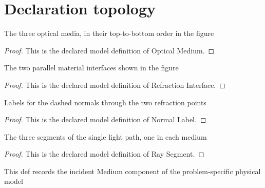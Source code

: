 \section{Declaration topology}
\begin{definition}
  \label{def:physics:phyx-mini-0000:phyxminiproblems-problemphyxmini0000-opticalmedium}
  The three optical media, in their top-to-bottom order in the figure
\end{definition}
\begin{proof}
  This is the declared model definition of Optical Medium.
\end{proof}
\begin{definition}
  \label{def:physics:phyx-mini-0000:phyxminiproblems-problemphyxmini0000-refractioninterface}
  The two parallel material interfaces shown in the figure
\end{definition}
\begin{proof}
  This is the declared model definition of Refraction Interface.
\end{proof}
\begin{definition}
  \label{def:physics:phyx-mini-0000:phyxminiproblems-problemphyxmini0000-normallabel}
  Labels for the dashed normals through the two refraction points
\end{definition}
\begin{proof}
  This is the declared model definition of Normal Label.
\end{proof}
\begin{definition}
  \label{def:physics:phyx-mini-0000:phyxminiproblems-problemphyxmini0000-raysegment}
  The three segments of the single light path, one in each medium
\end{definition}
\begin{proof}
  This is the declared model definition of Ray Segment.
\end{proof}
\begin{definition}
  \label{def:physics:phyx-mini-0000:phyxminiproblems-problemphyxmini0000-refractioninterface-incidentmedium}
  This def records the incident Medium component of the problem-specific physical model
\end{definition}
